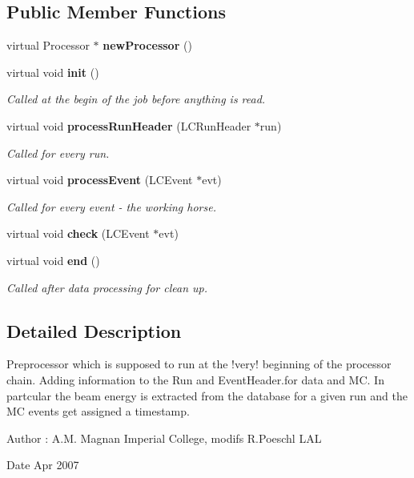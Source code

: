 \subsection*{Public Member Functions}
\begin{DoxyCompactItemize}
\item 
virtual Processor $\ast$ {\bfseries newProcessor} ()\label{classmarlin_1_1TBTrackRemover_aabd6f4686ad80cd4dc5c00ad485532ab}

\item 
virtual void {\bf init} ()
\begin{DoxyCompactList}\small\item\em Called at the begin of the job before anything is read. \item\end{DoxyCompactList}\item 
virtual void {\bf processRunHeader} (LCRunHeader $\ast$run)\label{classmarlin_1_1TBTrackRemover_a7a4a783bba99c63bf4dfd424a39b461a}

\begin{DoxyCompactList}\small\item\em Called for every run. \item\end{DoxyCompactList}\item 
virtual void {\bf processEvent} (LCEvent $\ast$evt)\label{classmarlin_1_1TBTrackRemover_a6a9ccb473b3383d1ccb978e3ba8a7760}

\begin{DoxyCompactList}\small\item\em Called for every event -\/ the working horse. \item\end{DoxyCompactList}\item 
virtual void {\bfseries check} (LCEvent $\ast$evt)\label{classmarlin_1_1TBTrackRemover_a24007dc2befc665be3688fc38683e002}

\item 
virtual void {\bf end} ()\label{classmarlin_1_1TBTrackRemover_af53b200afa75c5e10cc2fe2ccb19672b}

\begin{DoxyCompactList}\small\item\em Called after data processing for clean up. \item\end{DoxyCompactList}\end{DoxyCompactItemize}


\subsection{Detailed Description}
Preprocessor which is supposed to run at the !very! beginning of the processor chain. Adding information to the Run and EventHeader.for data and MC. In partcular the beam energy is extracted from the database for a given run and the MC events get assigned a timestamp. \begin{DoxyAuthor}{Author}
: A.M. Magnan Imperial College, modifs R.Poeschl LAL
\end{DoxyAuthor}
\begin{DoxyDate}{Date}
Apr 2007 
\end{DoxyDate}


